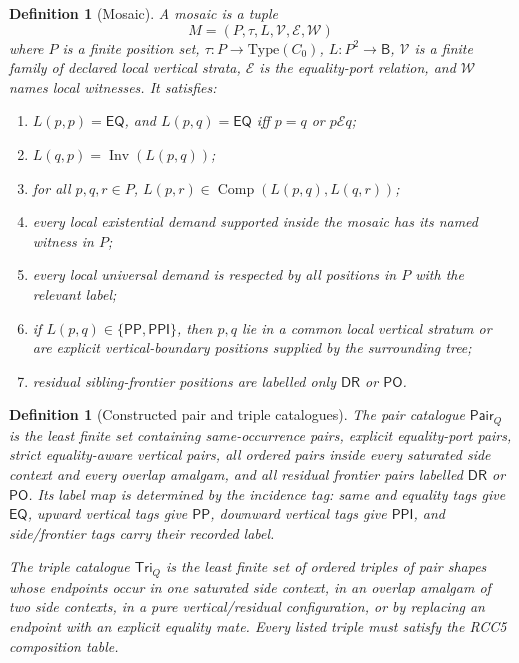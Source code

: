 \documentclass[11pt]{article}
\newtheorem{definition}[theorem]{Definition}
\newcommand{\Base}{\mathsf B}
\newcommand{\EQ}{\mathsf{EQ}}
\newcommand{\PP}{\mathsf{PP}}
\newcommand{\PPI}{\mathsf{PPI}}
\newcommand{\PO}{\mathsf{PO}}
\newcommand{\DR}{\mathsf{DR}}
\newcommand{\Inv}{\operatorname{Inv}}
\newcommand{\comp}{\operatorname{Comp}}
\newcommand{\Pair}{\mathsf{Pair}}
\newcommand{\Tri}{\mathsf{Tri}}
\begin{document}
\begin{definition}[Mosaic]
A mosaic is a tuple
\[
  M=(P,\tau,L,\mathcal V,\mathcal E,\mathcal W)
\]
where \(P\) is a finite position set, \(\tau:P\to\mathrm{Type}(C_0)\), \(L:P^2\to\Base\), \(\mathcal V\) is a finite family of declared local vertical strata, \(\mathcal E\) is the equality-port relation, and \(\mathcal W\) names local witnesses.  It satisfies:
\begin{enumerate}[label=(M\arabic*)]
\item \(L(p,p)=\EQ\), and \(L(p,q)=\EQ\) iff \(p=q\) or \(p\mathcal E q\);
\item \(L(q,p)=\Inv(L(p,q))\);
\item for all \(p,q,r\in P\), \(L(p,r)\in\comp(L(p,q),L(q,r))\);
\item every local existential demand supported inside the mosaic has its named witness in \(P\);
\item every local universal demand is respected by all positions in \(P\) with the relevant label;
\item if \(L(p,q)\in\{\PP,\PPI\}\), then \(p,q\) lie in a common local vertical stratum or are explicit vertical-boundary positions supplied by the surrounding tree;
\item residual sibling-frontier positions are labelled only \(\DR\) or \(\PO\).
\end{enumerate}
\end{definition}

\begin{definition}[Constructed pair and triple catalogues]
The pair catalogue \(\Pair_Q\) is the least finite set containing same-occurrence pairs, explicit equality-port pairs, strict equality-aware vertical pairs, all ordered pairs inside every saturated side context and every overlap amalgam, and all residual frontier pairs labelled \(\DR\) or \(\PO\).  Its label map is determined by the incidence tag: same and equality tags give \(\EQ\), upward vertical tags give \(\PP\), downward vertical tags give \(\PPI\), and side/frontier tags carry their recorded label.

The triple catalogue \(\Tri_Q\) is the least finite set of ordered triples of pair shapes whose endpoints occur in one saturated side context, in an overlap amalgam of two side contexts, in a pure vertical/residual configuration, or by replacing an endpoint with an explicit equality mate.  Every listed triple must satisfy the RCC5 composition table.
\end{definition}
\end{document}

